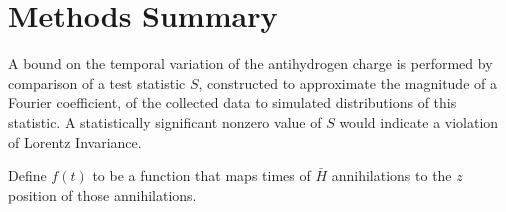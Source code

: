 \documentclass[superscriptaddress,aps,prb,11pt]{revtex4-1}
\begin{document}
\section{Methods Summary}
A bound on the temporal variation of the antihydrogen charge is performed by comparison of a test statistic $S$, constructed to approximate the magnitude of a Fourier coefficient, of the collected data to simulated distributions of this statistic.  A statistically significant nonzero value of $S$ would indicate a violation of Lorentz Invariance.

Define $f(t)$ to be a function that maps times of $\bar{H}$ annihilations to the $z$ position of those annihilations.

\begin{figure}
  \centering

\end{figure}
\end{document}
